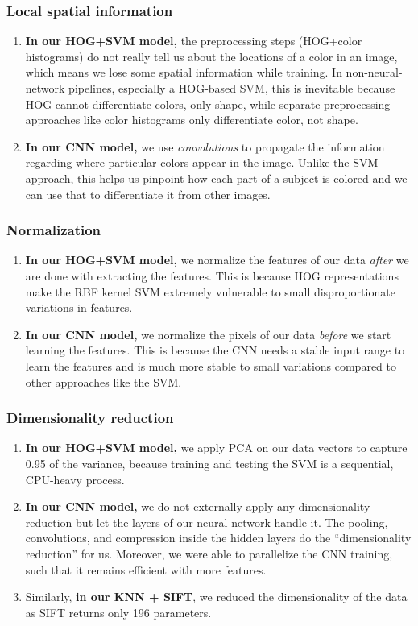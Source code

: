 \documentclass[10pt]{article} %
\begin{document}
\subsubsection{Local spatial information}
\begin{enumerate}
  \item \textbf{In our HOG+SVM model,} the preprocessing steps (HOG+color histograms) do not really tell us about the locations of a color in an image, which means we lose some spatial information while training. In non-neural-network pipelines, especially a HOG-based SVM, this is inevitable because HOG cannot differentiate colors, only shape, while separate preprocessing approaches like color histograms only differentiate color, not shape.
  \item \textbf{In our CNN model,} we use \textit{convolutions} to propagate the information regarding where particular colors appear in the image. Unlike the SVM approach, this helps us pinpoint how each part of a subject is colored and we can use that to differentiate it from other images.
\end{enumerate}
\subsubsection{Normalization}
\begin{enumerate}
  \item \textbf{In our HOG+SVM model,} we normalize the features of our data \textit{after} we are done with extracting the features. This is because HOG representations make the RBF kernel SVM extremely vulnerable to small disproportionate variations in features.
  \item \textbf{In our CNN model,} we normalize the pixels of our data \textit{before} we start learning the features. This is because the CNN needs a stable input range to learn the features and is much more stable to small variations compared to other approaches like the SVM.
\end{enumerate}
\subsubsection{Dimensionality reduction}
\begin{enumerate}
  \item \textbf{In our HOG+SVM model,} we apply PCA on our data vectors to capture 0.95 of the variance, because training and testing the SVM is a sequential, CPU-heavy process.
  \item \textbf{In our CNN model,} we do not externally apply any dimensionality reduction but let the layers of our neural network handle it. The pooling, convolutions, and compression inside the hidden layers do the ``dimensionality reduction'' for us. Moreover, we were able to parallelize the CNN training, such that it remains efficient with more features.
  \item Similarly, \textbf{in our KNN + SIFT}, we reduced the dimensionality of the data as SIFT returns only 196 parameters.
\end{enumerate}
\end{document}
